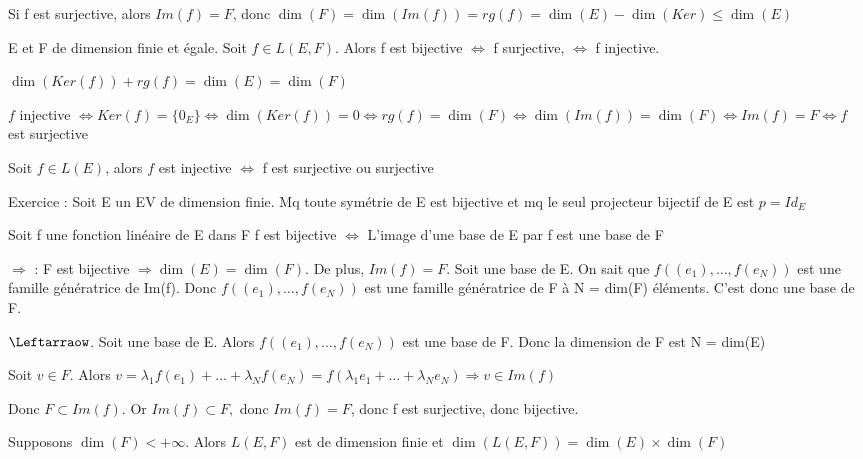 \documentclass[french]{yLectureNote}
\begin{document}
\begin{myproof}
 Si f est surjective, alors $Im(f) = F$, donc $\dim(F) = \dim(Im(f)) = rg(f) = \dim(E) - \dim(Ker)\leq \dim(E)$
\end{myproof}
\begin{proposition}[Cororllaire]
E et F de dimension finie et égale. Soit $f\in L(E,F)$. Alors f est bijective \(\iff\) f surjective, \(\iff\) f injective.
\end{proposition}
\begin{myproof}
 $\dim(Ker(f))+rg(f)=\dim(E) = \dim(F)$

 $f$ injective $\iff Ker(f) = \{0_E\} \iff \dim(Ker(f)) = 0 \iff rg(f) = \dim(F) \iff \dim(Im(f)) = \dim(F) \iff Im(f) = F \iff f$ est surjective
\end{myproof}
\begin{proposition}[Cororllaire]
Soit \(f\in L(E)\), alors \(f\) est injective \(\iff\) f est surjective ou surjective
\end{proposition}
Exercice : Soit E un EV de dimension finie. Mq toute symétrie de E est bijective et mq le seul projecteur bijectif de E est $p=Id_E$
\begin{proposition}
Soit f une fonction linéaire de E dans F
f est bijective \(\iff \) L'image d'une base de E par f est une base de F
\end{proposition}
\begin{myproof}
 $\Rightarrow$ : F est bijective $\Rightarrow \dim(E) = \dim(F)$. De plus, $Im(f) = F$. Soit une base de E. On sait que $f((e_1),\dots,f(e_N))$ est une famille génératrice de Im(f). Donc $f((e_1),\dots,f(e_N))$ est une famille génératrice de F à N = dim(F) éléments. C'est donc une base de F.

 $\Leftarraow$. Soit une base de E. Alors $f((e_1),\dots,f(e_N))$ est une base de F. Donc la dimension de F est N = dim(E)

 Soit $v\in F$. Alors $v = \lambda_1 f(e_1)+\dots+\lambda_N f(e_N) = f(\lambda_1e_1+\dots+\lambda_Ne_N) \Rightarrow v\in Im(f)$

 Donc $F\subset Im(f)$. Or $Im(f)\subset F, $ donc $Im(f) = F$, donc f est surjective, donc bijective.
\end{myproof}
\begin{proposition}
Supposons \(\dim(F)<+\infty\). Alors \(L(E,F)\) est de dimension finie et \(\dim(L(E,F)) = \dim(E)\times \dim(F)\)
\end{proposition}
\end{document}
